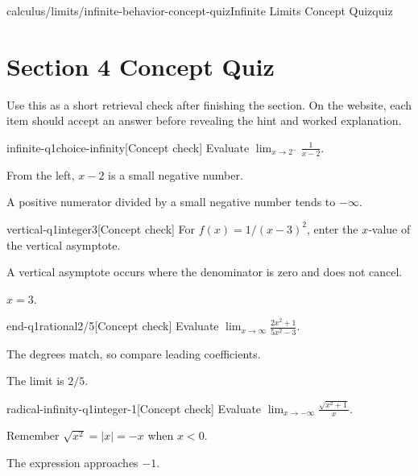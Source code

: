 \documentclass[11pt,openany]{book}
\theoremstyle{bgplain}
\newcounter{bgcheck}[section]
\begin{document}
\begin{webpage}{calculus/limits/infinite-behavior-concept-quiz}{Infinite Limits Concept Quiz}{quiz}
\section*{Section 4 Concept Quiz}

Use this as a short retrieval check after finishing the section. On the website, each item should accept an answer before revealing the hint and worked explanation.

\begin{bgcheck}{infinite-q1}{choice}{-infinity}[Concept check]
Evaluate \(\lim_{x\to2^-}\frac1{x-2}\).
\begin{bghint}
From the left, \(x-2\) is a small negative number.
\end{bghint}
\begin{bgreveal}
A positive numerator divided by a small negative number tends to \(-\infty\).
\end{bgreveal}
\end{bgcheck}

\begin{bgcheck}{vertical-q1}{integer}{3}[Concept check]
For \(f(x)=1/(x-3)^2\), enter the \(x\)-value of the vertical asymptote.
\begin{bghint}
A vertical asymptote occurs where the denominator is zero and does not cancel.
\end{bghint}
\begin{bgreveal}
\(x=3\).
\end{bgreveal}
\end{bgcheck}

\begin{bgcheck}{end-q1}{rational}{2/5}[Concept check]
Evaluate \(\lim_{x\to\infty}\frac{2x^2+1}{5x^2-3}\).
\begin{bghint}
The degrees match, so compare leading coefficients.
\end{bghint}
\begin{bgreveal}
The limit is \(2/5\).
\end{bgreveal}
\end{bgcheck}

\begin{bgcheck}{radical-infinity-q1}{integer}{-1}[Concept check]
Evaluate \(\lim_{x\to-\infty}\frac{\sqrt{x^2+1}}x\).
\begin{bghint}
Remember \(\sqrt{x^2}=|x|=-x\) when \(x<0\).
\end{bghint}
\begin{bgreveal}
The expression approaches \(-1\).
\end{bgreveal}
\end{bgcheck}


\end{webpage}
\end{document}
